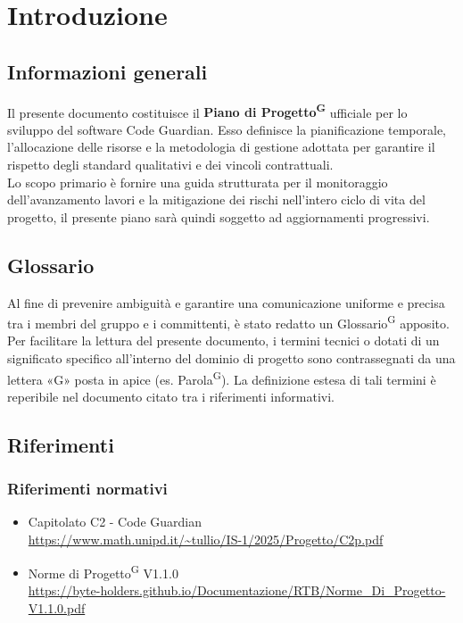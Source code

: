 \documentclass[a4paper, 11pt]{article}
\begin{document}
\pagestyle{fancy}
\newpage
\tableofcontents
\newpage
\listoftables
\newpage
\listoffigures
\newpage

\section{Introduzione}

\subsection{Informazioni generali}
Il presente documento costituisce il \textbf{Piano di Progetto\textsuperscript{G}} ufficiale per lo sviluppo del software Code Guardian. Esso definisce la pianificazione temporale, l'allocazione delle risorse e la metodologia di gestione adottata per garantire il rispetto degli standard qualitativi e dei vincoli contrattuali. \\[0.5cm]
Lo scopo primario è fornire una guida strutturata per il monitoraggio dell'avanzamento lavori e la mitigazione dei rischi nell'intero ciclo di vita del progetto, il presente piano sarà quindi soggetto ad aggiornamenti progressivi.

\subsection{Glossario}
Al fine di prevenire ambiguità e garantire una comunicazione uniforme e precisa tra i membri del gruppo e i committenti, è stato redatto un Glossario\textsuperscript{G} apposito.
Per facilitare la lettura del presente documento, i termini tecnici o dotati di un significato specifico all'interno del dominio di progetto sono contrassegnati da una lettera «G» posta in apice (es. Parola\textsuperscript{G}).
La definizione estesa di tali termini è reperibile nel documento citato tra i riferimenti informativi.

\subsection{Riferimenti}
\subsubsection{Riferimenti normativi}
\begin{itemize}
  \item
  	Capitolato C2 - Code Guardian\\
  	\url{https://www.math.unipd.it/~tullio/IS-1/2025/Progetto/C2p.pdf}
  \item 
  	Norme di Progetto\textsuperscript{G} V1.1.0\\
  	\url{https://byte-holders.github.io/Documentazione/RTB/Norme_Di_Progetto-V1.1.0.pdf}
\end{itemize}
\end{document}
